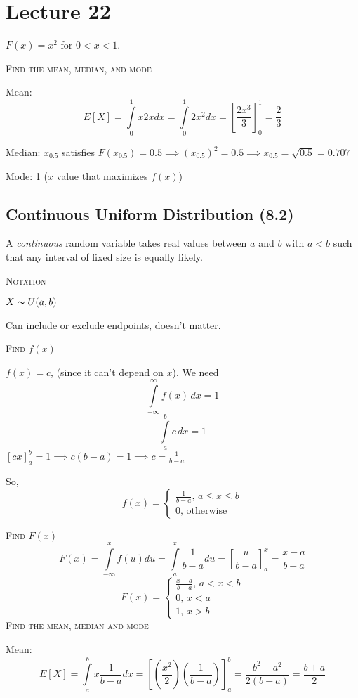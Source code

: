 \section{Lecture 22}

$ F(x)=x^2 $ for $ 0<x<1 $.

\textsc{Find the mean, median, and mode}

Mean:
\[ E[X]=\int\limits_{0}^{1} x2x d{x} =\int\limits_{0}^{1} 2x^2 d{x}=
\left[\frac{2x^3}{3}\right]_0^1=\frac{2}{3} \]

Median:
$ x_{0.5} $ satisfies $ F(x_{0.5})=0.5 \implies (x_{0.5})^2=0.5\implies x_{0.5}=
\sqrt{0.5}=0.707$

Mode: 1 ($ x $ value that maximizes $ f(x) $)

\subsection{Continuous Uniform Distribution (8.2)}
A \emph{continuous} random variable takes real values between $ a $ and
$ b $ with $ a<b $ such that any interval of fixed size is equally likely.

\textsc{Notation}

$ X \thicksim U(a,b) $
\begin{remark}
    Can include or exclude endpoints, doesn't matter.
\end{remark}

\textsc{Find $f(x)$}

$ f(x)=c $, (since it can't depend on $ x $). We need
\[ \int\limits_{-\infty}^{\infty} f(x)\,d{x} =1 \]
\[ \int\limits_{a}^{b} c\,d{x} =1 \]
$ \left[cx\right]_a^b=1\implies c(b-a)=1\implies c=\frac{1}{b-a} $

So,
\[ f(x)=\begin{cases}
    \frac{1}{b-a},\, a\le x\le b\\
    0,\, \text{otherwise}
\end{cases} \]

\textsc{Find $ F(x) $}
\[ F(x)=\int\limits_{-\infty}^{x} f(u) d{u}
=\int\limits_{a}^{x} \frac{1}{b-a} d{u}
=\left[\frac{u}{b-a}\right]_a^x=\frac{x-a}{b-a} \]
\[ F(x)=\begin{cases}
    \frac{x-a}{b-a},\, a<x<b\\
    0,\,x<a\\
    1,\,x>b
\end{cases} \]
\textsc{Find the mean, median and mode}

Mean:
\[ E[X]=\int\limits_{a}^{b} x \frac{1}{b-a} d{x}
=\left[\left(\frac{x^2}{2}\right)\left(\frac{1}{b-a}\right)\right]_a^b
=\frac{b^2-a^2}{2(b-a)}=\frac{b+a}{2} \]

